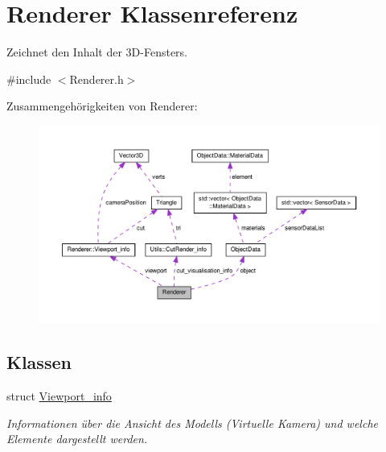 \hypertarget{classRenderer}{\section{Renderer Klassenreferenz}
\label{classRenderer}
}


Zeichnet den Inhalt der 3\-D-\/\-Fensters.  




{\ttfamily \#include $<$Renderer.\-h$>$}



Zusammengehörigkeiten von Renderer\-:
\nopagebreak
\begin{figure}[H]
\begin{center}
\leavevmode
\includegraphics[width=350pt]{classRenderer__coll__graph}
\end{center}
\end{figure}
\subsection*{Klassen}
\begin{DoxyCompactItemize}
\item 
struct \hyperlink{structRenderer_1_1Viewport__info}{Viewport\-\_\-info}
\begin{DoxyCompactList}\small\item\em Informationen über die Ansicht des Modells (Virtuelle Kamera) und welche Elemente dargestellt werden. \end{DoxyCompactList}\end{DoxyCompactItemize}

